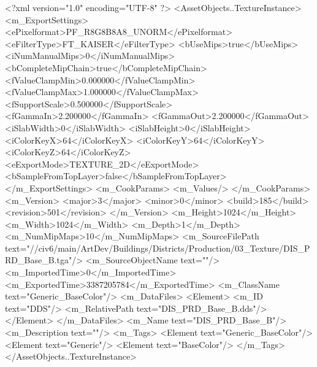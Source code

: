 <?xml version="1.0" encoding="UTF-8" ?>
<AssetObjects..TextureInstance>
	<m_ExportSettings>
		<ePixelformat>PF_R8G8B8A8_UNORM</ePixelformat>
		<eFilterType>FT_KAISER</eFilterType>
		<bUseMips>true</bUseMips>
		<iNumManualMips>0</iNumManualMips>
		<bCompleteMipChain>true</bCompleteMipChain>
		<fValueClampMin>0.000000</fValueClampMin>
		<fValueClampMax>1.000000</fValueClampMax>
		<fSupportScale>0.500000</fSupportScale>
		<fGammaIn>2.200000</fGammaIn>
		<fGammaOut>2.200000</fGammaOut>
		<iSlabWidth>0</iSlabWidth>
		<iSlabHeight>0</iSlabHeight>
		<iColorKeyX>64</iColorKeyX>
		<iColorKeyY>64</iColorKeyY>
		<iColorKeyZ>64</iColorKeyZ>
		<eExportMode>TEXTURE_2D</eExportMode>
		<bSampleFromTopLayer>false</bSampleFromTopLayer>
	</m_ExportSettings>
	<m_CookParams>
		<m_Values/>
	</m_CookParams>
	<m_Version>
		<major>3</major>
		<minor>0</minor>
		<build>185</build>
		<revision>501</revision>
	</m_Version>
	<m_Height>1024</m_Height>
	<m_Width>1024</m_Width>
	<m_Depth>1</m_Depth>
	<m_NumMipMaps>10</m_NumMipMaps>
	<m_SourceFilePath text="//civ6/main/ArtDev/Buildings/Districts/Production/03_Texture/DIS_PRD_Base_B.tga"/>
	<m_SourceObjectName text=""/>
	<m_ImportedTime>0</m_ImportedTime>
	<m_ExportedTime>3387205784</m_ExportedTime>
	<m_ClassName text="Generic_BaseColor"/>
	<m_DataFiles>
		<Element>
			<m_ID text="DDS"/>
			<m_RelativePath text="DIS_PRD_Base_B.dds"/>
		</Element>
	</m_DataFiles>
	<m_Name text="DIS_PRD_Base_B"/>
	<m_Description text=""/>
	<m_Tags>
		<Element text="Generic_BaseColor"/>
		<Element text="Generic"/>
		<Element text="BaseColor"/>
	</m_Tags>
</AssetObjects..TextureInstance>

